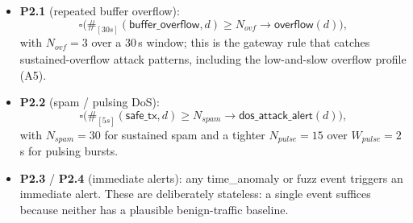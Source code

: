 \documentclass[runningheads]{llncs}
\begin{document}
\begin{itemize}\setlength{\itemsep}{1pt}
\item \textbf{P2.1} (repeated buffer overflow):
   \[\square\bigl(\#_{[30s]}(\textsf{buffer\_overflow},d) \geq
     N_{\mathit{ovf}}
     \to \textsf{overflow}(d)\bigr),\]
   with $N_{\mathit{ovf}}=3$ over a 30\,s window; this is the
   gateway rule that catches sustained-overflow attack patterns,
   including the low-and-slow overflow profile (A5).
\item \textbf{P2.2} (spam / pulsing DoS):
   \[\square\bigl(\#_{[5s]}(\textsf{safe\_tx},d) \geq
     N_{\mathit{spam}}
     \to \textsf{dos\_attack\_alert}(d)\bigr),\]
   with $N_{\mathit{spam}}=30$ for sustained spam and a tighter
   $N_{\mathit{pulse}}=15$ over $W_{\mathit{pulse}}=2$\,s for
   pulsing bursts.
\item \textbf{P2.3} / \textbf{P2.4} (immediate alerts):
   any \textsf{time\_anomaly} or \textsf{fuzz} event triggers an
   immediate alert.  These are deliberately stateless: a
   single event suffices because neither has a plausible
   benign-traffic baseline.
\end{itemize}
\end{document}
